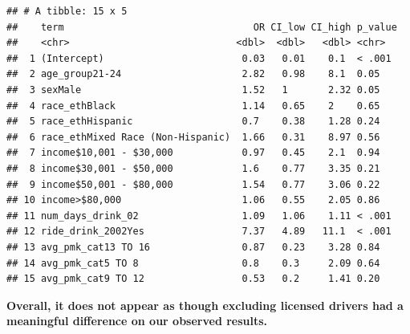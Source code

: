 \documentclass[
]{article}
\begin{document}
\begin{verbatim}
## # A tibble: 15 x 5
##    term                                 OR CI_low CI_high p_value
##    <chr>                             <dbl>  <dbl>   <dbl> <chr>  
##  1 (Intercept)                        0.03   0.01    0.1  < .001 
##  2 age_group21-24                     2.82   0.98    8.1  0.05   
##  3 sexMale                            1.52   1       2.32 0.05   
##  4 race_ethBlack                      1.14   0.65    2    0.65   
##  5 race_ethHispanic                   0.7    0.38    1.28 0.24   
##  6 race_ethMixed Race (Non-Hispanic)  1.66   0.31    8.97 0.56   
##  7 income$10,001 - $30,000            0.97   0.45    2.1  0.94   
##  8 income$30,001 - $50,000            1.6    0.77    3.35 0.21   
##  9 income$50,001 - $80,000            1.54   0.77    3.06 0.22   
## 10 income>$80,000                     1.06   0.55    2.05 0.86   
## 11 num_days_drink_02                  1.09   1.06    1.11 < .001 
## 12 ride_drink_2002Yes                 7.37   4.89   11.1  < .001 
## 13 avg_pmk_cat13 TO 16                0.87   0.23    3.28 0.84   
## 14 avg_pmk_cat5 TO 8                  0.8    0.3     2.09 0.64   
## 15 avg_pmk_cat9 TO 12                 0.53   0.2     1.41 0.20
\end{verbatim}

\textbf{Overall, it does not appear as though excluding licensed drivers
had a meaningful difference on our observed results.}
\end{document}
